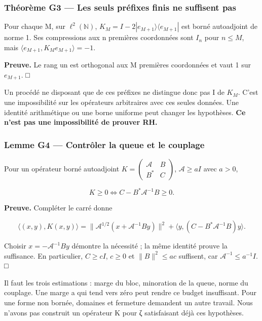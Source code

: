 \documentclass[
  10pt,
  a4paper,
]{article}
\begin{document}
\newpage

\hypertarget{thuxe9oruxe8me-g3-les-seuls-pruxe9fixes-finis-ne-suffisent-pas}{%
\subsubsection{Théorème G3 --- Les seuls préfixes finis ne suffisent
pas}\label{thuxe9oruxe8me-g3-les-seuls-pruxe9fixes-finis-ne-suffisent-pas}}

Pour chaque M, sur \(\ell^2(\mathbb N)\),
\(K_M=I-2|e_{M+1}\rangle\langle e_{M+1}|\) est borné autoadjoint de
norme 1. Ses compressions aux n premières coordonnées sont \(I_n\) pour
\(n\le M\), mais \(\langle e_{M+1},K_Me_{M+1}\rangle=-1\).

\textbf{Preuve.} Le rang un est orthogonal aux M premières coordonnées
et vaut 1 sur \(e_{M+1}\). □

Un procédé ne disposant que de ces préfixes ne distingue donc pas I de
\(K_M\). C'est une impossibilité sur les opérateurs arbitraires avec ces
seules données. Une identité arithmétique ou une borne uniforme peut
changer les hypothèses. \textbf{Ce n'est pas une impossibilité de
prouver RH.}

\hypertarget{lemme-g4-contruxf4ler-la-queue-et-le-couplage}{%
\subsubsection{Lemme G4 --- Contrôler la queue et le
couplage}\label{lemme-g4-contruxf4ler-la-queue-et-le-couplage}}

Pour un opérateur borné autoadjoint
\(K=\begin{pmatrix}\mathcal A&B\\B^*&C\end{pmatrix}\),
\(\mathcal A\ge aI\) avec \(a>0\),

\[
K\ge0\iff C-B^*\mathcal A^{-1}B\ge0.
\]

\textbf{Preuve.} Compléter le carré donne

\[
\langle(x,y),K(x,y)\rangle
=\|\mathcal A^{1/2}(x+\mathcal A^{-1}By)\|^2
+\langle y,(C-B^*\mathcal A^{-1}B)y\rangle.
\]

Choisir \(x=-\mathcal A^{-1}By\) démontre la nécessité ; la même
identité prouve la suffisance. En particulier, \(C\ge cI\), \(c\ge0\) et
\(\|B\|^2\le ac\) suffisent, car \(\mathcal A^{-1}\le a^{-1}I\). □

Il faut les trois estimations : marge du bloc, minoration de la queue,
norme du couplage. Une marge a qui tend vers zéro peut rendre ce budget
insuffisant. Pour une forme non bornée, domaines et fermeture demandent
un autre travail. Nous n'avons pas construit un opérateur K pour ζ
satisfaisant déjà ces hypothèses.
\end{document}
